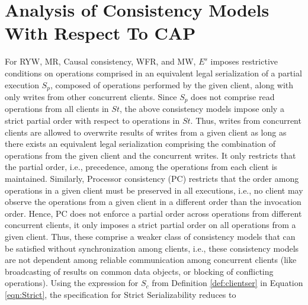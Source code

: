 \documentclass{sig-alternate-05-2015}
\begin{document}
\section{Analysis of Consistency Models With Respect To CAP}
 For RYW, MR, Causal consistency, WFR, and MW, $E^s$ imposes restrictive conditions on operations comprised in an
equivalent legal serialization of a partial execution $S_p$, composed of operations performed by the given client, along with only
writes from other concurrent clients. Since $S_p$ does not comprise read operations from all clients in   $\mathit{St}$, the above consistency models impose only a strict partial order with respect to  operations in $\mathit{St}$. Thus, writes from concurrent clients are allowed to overwrite results of writes from
a given client as long as there exists an equivalent legal serialization comprising the combination of
operations from the given client and the concurrent writes. It only restricts that the partial order, i.e., precedence, among the operations from
each client is maintained. Similarly, Processor consistency (PC) restricts that the order among operations in a given client must be preserved in all executions, i.e., no client may observe the operations from a given client in a different order than the invocation order. Hence, PC does not enforce a partial order  across operations from different concurrent clients, it only imposes a strict partial order on all operations from a given client.  Thus, these comprise a weaker class of consistency models that can be satisfied without synchronization
among clients, i.e., these consistency models are not dependent among reliable communication among concurrent clients (like broadcasting
of results on common data objects, or blocking of conflicting operations). %
 Using the expression for $S_c$ from Definition \ref{def:clientser} in Equation \ref{eqn:Strict}, the specification for Strict
 Serializability reduces to
\end{document}
